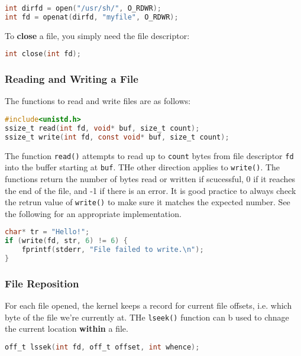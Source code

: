 \documentclass{article}
\newcommand{\bold}[1]{\textbf{#1}}
\newcommand{\code}[1]{\texttt{#1}}
\begin{document}
\begin{lstlisting}[language=C]
int dirfd = open("/usr/sh/", O_RDWR);
int fd = openat(dirfd, "myfile", O_RDWR);
\end{lstlisting}

\noindent To \bold{close} a file, you simply need the file descriptor:

\begin{lstlisting}[language=C]
int close(int fd);
\end{lstlisting}

\subsubsection{Reading and Writing a File}

The functions to read and write files are as follows: 

\begin{lstlisting}[language=C]
#include<unistd.h>
ssize_t read(int fd, void* buf, size_t count);
ssize_t write(int fd, const void* buf, size_t count);
\end{lstlisting}

\noindent The function \code{read()} attempts to read up to \code{count} bytes from file descriptor \code{fd} into the buffer starting at \code{buf}. THe other direction applies to \code{write()}. The functions return the number of bytes read or written if scucessful, 0 if it reaches the end of the file, and -1 if there is an error. It is good practice to always check the retrun value of \code{write()} to make sure it matches the expected number. See the following for an appropriate implementation.

\begin{lstlisting}[language=C]
char* tr = "Hello!";
if (write(fd, str, 6) != 6) { 
    fprintf(stderr, "File failed to write.\n");
}
\end{lstlisting}

\subsubsection{File Reposition}

For each file opened, the kernel keeps a record for current file offsets, i.e. which byte of the file we're currently at. THe \code{lseek()} function can b used to chnage the current location \bold{within} a file.

\begin{lstlisting}[language=C]
off_t lssek(int fd, off_t offset, int whence);
\end{lstlisting}
\end{document}
